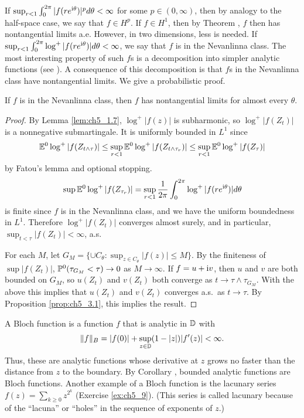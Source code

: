 
If $\sup_{r<1} \int_0^{2\pi} |f(re^{\im\theta})|^p d\theta < \infty$ for some $p \in (0,\infty)$, then by analogy to the half-space case, we say that $f \in H^p$. If $f \in H^1$, then by Theorem , $f$ then has nontangential limits a.e. However, in two dimensions, less is needed. If $\sup_{r<1} \int_0^{2\pi} \log^+ |f(re^{\im\theta})|d\theta < \infty$, we say that $f$ is in the Nevanlinna class. The most interesting property of such $f$s is a decomposition into simpler analytic functions (see \cite{Garnett1981}). A consequence of this decomposition is that $f$s in the Nevanlinna class have nontangential limits. We give a probabilistic proof.

\begin{proposition}\label{prop:ch5_3.8}
If $f$ is in the Nevanlinna class, then $f$ has nontangential limits for almost every $\theta$.
\end{proposition}

\begin{proof}
By Lemma \ref{lem:ch5_1.7}, $\log^+ |f(z)|$ is subharmonic, so $\log^+ |f(Z_t)|$ is a nonnegative submartingale. It is uniformly bounded in $L^1$ since
\[
    \E^0\log^+ |f(Z_{t\wedge\tau})| \leq \sup_{r<1}\E^0\log^+ |f(Z_{t\wedge\tau_r})| \leq \sup_{r<1}\E^0\log^+ |f(Z_\tau)|
\]
by Fatou's lemma and optional stopping.
\[
    \sup \E^0\log^+ |f(Z_{\tau_r})| = \sup_{r<1} \frac{1}{2\pi}\int_0^{2\pi} \log^+ |f(re^{\im\theta})|d\theta
\]
is finite since $f$ is in the Nevanlinna class, and we have the uniform boundedness in $L^1$. Therefore $\log^+ |f(Z_t)|$ converges almost surely, and in particular, $\sup_{t<\tau} |f(Z_t)| < \infty$, a.s.

For each $M$, let $G_M = \{\cup C_\theta : \sup_{z\in C_\theta} |f(z)| \leq M\}$. By the finiteness of $\sup |f(Z_t)|$, $\P^0(\tau_{G_M} < \tau) \to 0$ as $M \to \infty$. If $f = u+\im v$, then $u$ and $v$ are both bounded on $G_M$, so $u(Z_t)$ and $v(Z_t)$ both converge as $t \to \tau \wedge \tau_{G_M}$. With the above this implies that $u(Z_t)$ and $v(Z_t)$ converges a.s.\ as $t \to \tau$. By Proposition \ref{prop:ch5_3.1}, this implies the result.
\end{proof}


A Bloch function is a function $f$ that is analytic in $\D$ with
\begin{equation}\label{eq:ch5_3.18}
    \|f\|_B = |f(0)| + \sup_{z\in\D}(1-|z|)|f'(z)| < \infty.
\end{equation}
Thus, these are analytic functions whose derivative at $z$ grows no faster than the distance from $z$ to the boundary. By Corollary , bounded analytic functions are Bloch functions. Another example of a Bloch function is the lacunary series $f(z) = \sum_{k\geq 0} z^{2^k}$ (Exercise \ref{ex:ch5_9}). (This series is called lacunary because of the ``lacuna'' or ``holes'' in the sequence of exponents of $z$.)

